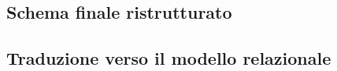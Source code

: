 \documentclass[11pt]{article}
\begin{document}
\subsection{Schema finale ristrutturato}
\begin{figure}[H]
    \centering
\end{figure}

\subsection{Traduzione verso il modello relazionale}
\end{document}
